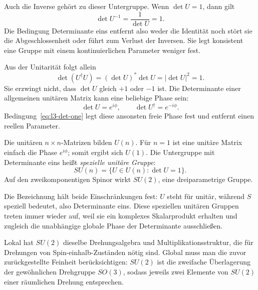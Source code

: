Auch die Inverse gehört zu dieser Untergruppe. Wenn \(\det U=1\), dann gilt
\begin{equation}
\det U^{-1}=\frac{1}{\det U}=1.
\end{equation}
Die Bedingung Determinante eins entfernt also weder die Identität noch stört sie die Abgeschlossenheit oder führt zum Verlust der Inversen. Sie legt konsistent eine Gruppe mit einem kontinuierlichen Parameter weniger fest.

Aus der Unitarität folgt allein
\begin{equation}
\det(U^\dagger U)=
(\det U)^*\det U
=|\det U|^2=1.
\end{equation}
Sie erzwingt nicht, dass \(\det U\) gleich \(+1\) oder \(-1\) ist. Die Determinante einer allgemeinen unitären Matrix kann eine beliebige Phase sein:
\begin{equation}
\det U=e^{i\phi},
\qquad
\det U^\dagger=e^{-i\phi}.
\end{equation}
Bedingung~\eqref{eq:l3-det-one} legt diese ansonsten freie Phase fest und entfernt einen reellen Parameter.

\begin{classroomqa}\end{classroomqa}

Die unitären \(n\times n\)-Matrizen bilden \(U(n)\). Für \(n=1\) ist eine unitäre Matrix einfach die Phase \(e^{i\phi}\); somit ergibt sich \(U(1)\). Die Untergruppe mit Determinante eins heißt \emph{spezielle unitäre Gruppe}:
\begin{equation}
SU(n)=\{U\in U(n):\det U=1\}.
\end{equation}
Auf den zweikomponentigen Spinor wirkt \(SU(2)\), eine dreiparametrige Gruppe.

Die Bezeichnung hält beide Einschränkungen fest: \(U\) steht für unitär, während \(S\) speziell bedeutet, also Determinante eins. Diese speziellen unitären Gruppen treten immer wieder auf, weil sie ein komplexes Skalarprodukt erhalten und zugleich die unabhängige globale Phase der Determinante ausschließen.

Lokal hat \(SU(2)\) dieselbe Drehungsalgebra und Multiplikationsstruktur, die für Drehungen von Spin-einhalb-Zuständen nötig sind. Global muss man die zuvor zurückgestellte Feinheit berücksichtigen: \(SU(2)\) ist die zweifache Überlagerung der gewöhnlichen Drehgruppe \(SO(3)\), sodass jeweils zwei Elemente von \(SU(2)\) einer räumlichen Drehung entsprechen. 

